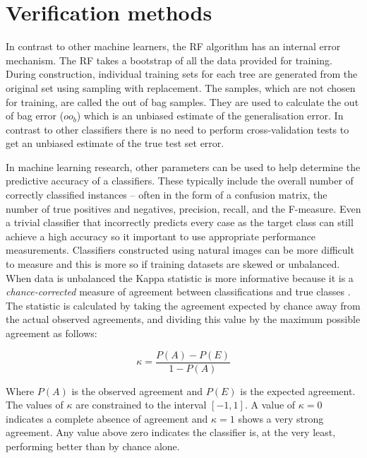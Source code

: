 \section{Verification methods}\label{sec:verification-methods}
In contrast to other machine learners, the \ac{RF} algorithm has an internal error mechanism. The \ac{RF} takes a bootstrap of all the data provided for training. During construction, individual training sets for each tree are generated from the original set using sampling with replacement. The samples, which are not chosen for training, are called the out of bag samples. They are used to calculate the out of bag error ($ oo_{b} $) which is an unbiased estimate of the generalisation error. In contrast to other classifiers there is no need to perform cross-validation tests to get an unbiased estimate of the true test set error. 

In machine learning research, other parameters can be used to help determine the predictive accuracy of a classifiers. These typically include the overall number of correctly classified instances -- often in the form of a confusion matrix, the number of true positives and negatives, precision, recall, and the F-measure. Even a trivial classifier that incorrectly predicts every case as the target class can still achieve a high accuracy so it important to use appropriate performance measurements. Classifiers constructed using natural images can be more difficult to measure and this is more so if training datasets are skewed or unbalanced. When data is unbalanced the Kappa statistic is more informative because it is a \emph{chance-corrected} measure of agreement between classifications and true classes \cite{Di2004}. The statistic is calculated by taking the agreement expected by chance away from the actual observed agreements, and dividing this value by the maximum possible agreement as follows:

\begin{equation}
\kappa = \dfrac{P(A)-P(E)}{1-P(A)} \label{eq:kapa}
\end{equation}

Where $ P(A) $ is the observed agreement and $ P(E) $ is the expected agreement. The values of $\kappa$ are constrained to the interval $[-1, 1]$. A value of $\kappa = 0$ indicates a complete absence of agreement and $\kappa = 1$ shows a very strong agreement. Any value above zero indicates the classifier is, at the very least, performing better than by chance alone.


